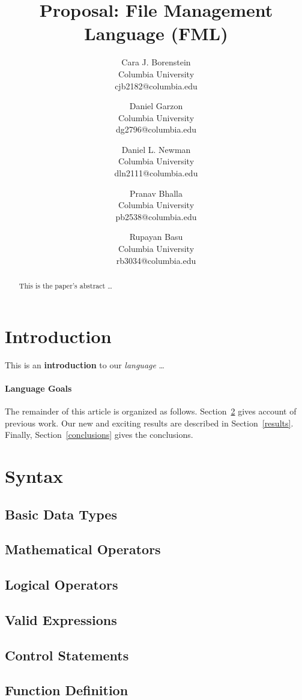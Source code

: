 \documentclass[11pt]{article}
\title{\textbf{\huge Proposal: File Management Language (FML)}}
\author{
  Cara J. Borenstein\\
  Columbia University\\
  cjb2182@columbia.edu
  \and
  Daniel Garzon\\
  Columbia University\\
  dg2796@columbia.edu
  \and
  Daniel L. Newman\\
  Columbia University\\
  dln2111@columbia.edu
  \and
  Pranav Bhalla\\
  Columbia University\\
  pb2538@columbia.edu
  \and
  Rupayan Basu\\
  Columbia University\\
  rb3034@columbia.edu
}
\date{}
\begin{document}
\changepage{1cm}{}{}{}{}{-1cm}{}{}{}

\maketitle


\begin{abstract}
This is the paper's abstract \ldots
\end{abstract}

\section{Introduction}
This is an \textbf{introduction} to our \emph{language} \ldots

\paragraph{Language Goals}
The remainder of this article is organized as follows.
Section~\ref{previous work} gives account of previous work.
Our new and exciting results are described in Section~\ref{results}.
Finally, Section~\ref{conclusions} gives the conclusions.

\section{Syntax}\label{previous work}

\subsection{Basic Data Types}
\subsection{Mathematical Operators}
\subsection{Logical Operators}
\subsection{Valid Expressions}
\subsection{Control Statements}
\subsection{Function Definition}
\end{document}
